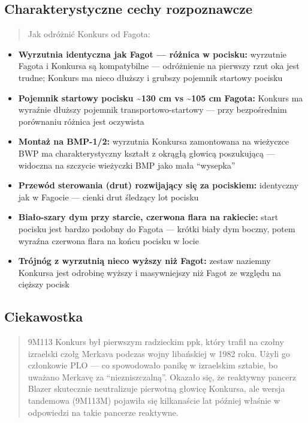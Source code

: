 \documentclass[12pt,oneside]{book}
\providecommand{\tightlist}{%
  \setlength{\itemsep}{0pt}\setlength{\parskip}{0pt}}
\begin{document}
\subsection{Charakterystyczne cechy
rozpoznawcze}\label{charakterystyczne-cechy-rozpoznawcze-50}

\begin{quote}
Jak odróżnić Konkurs od Fagota:
\end{quote}

\begin{itemize}
\tightlist
\item
  \textbf{Wyrzutnia identyczna jak Fagot --- różnica w pocisku:}
  wyrzutnie Fagota i Konkursa są kompatybilne --- odróżnienie na
  pierwszy rzut oka jest trudne; Konkurs ma nieco dłuższy i grubszy
  pojemnik startowy pocisku
\item
  \textbf{Pojemnik startowy pocisku \textasciitilde130 cm vs
  \textasciitilde105 cm Fagota:} Konkurs ma wyraźnie dłuższy pojemnik
  transportowo-startowy --- przy bezpośrednim porównaniu różnica jest
  oczywista
\item
  \textbf{Montaż na BMP-1/2:} wyrzutnia Konkursa zamontowana na
  wieżyczce BWP ma charakterystyczny kształt z okrągłą głowicą
  poszukującą --- widoczna na szczycie wieżyczki BMP jako mała
  ``wysepka''
\item
  \textbf{Przewód sterowania (drut) rozwijający się za pociskiem:}
  identyczny jak w Fagocie --- cienki drut śledzący lot pocisku
\item
  \textbf{Biało-szary dym przy starcie, czerwona flara na rakiecie:}
  start pocisku jest bardzo podobny do Fagota --- krótki biały dym
  boczny, potem wyraźna czerwona flara na końcu pocisku w locie
\item
  \textbf{Trójnóg z wyrzutnią nieco wyższy niż Fagot:} zestaw naziemny
  Konkursa jest odrobinę wyższy i masywniejszy niż Fagot ze względu na
  cięższy pocisk
\end{itemize}

\subsection{Ciekawostka}\label{ciekawostka-50}

\begin{quote}
9M113 Konkurs był pierwszym radzieckim ppk, który trafił na czołny
izraelski czołg Merkava podczas wojny libańskiej w 1982 roku. Użyli go
członkowie PLO --- co spowodowało panikę w izraelskim sztabie, bo
uważano Merkavę za ``niezniszczalną''. Okazało się, że reaktywny pancerz
Blazer skutecznie neutralizuje pierwotną głowicę Konkursa, ale wersja
tandemowa (9M113M) pojawiła się kilkanaście lat później właśnie w
odpowiedzi na takie pancerze reaktywne.
\end{quote}
\end{document}
